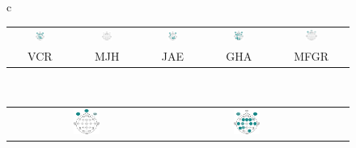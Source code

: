 \begin{figure}
\centering
\begin{tabular}{c}
\begin{tabular}{ccccc}
\includegraphics[width=0.17\textwidth]{./img_diagramas/cabecita_VCR.pdf} &
\includegraphics[width=0.17\textwidth]{./img_diagramas/cabecita_MJH.pdf} &
\includegraphics[width=0.17\textwidth]{./img_diagramas/cabecita_JAE.pdf} &
\includegraphics[width=0.17\textwidth]{./img_diagramas/cabecita_GHA.pdf} &
\includegraphics[width=0.17\textwidth]{./img_diagramas/cabecita_MFGR.pdf} \\
VCR & MJH & JAE & GHA & MFGR
\end{tabular}
\\
\begin{tabular}{cccc}
\includegraphics[width=0.17\textwidth]{./img_diagramas/cabecita_CLO.pdf} &
\includegraphics[width=0.17\textwidth]{./img_diagramas/cabecita_RLO.pdf} &

\end{tabular}
\end{tabular}
\end{figure}
